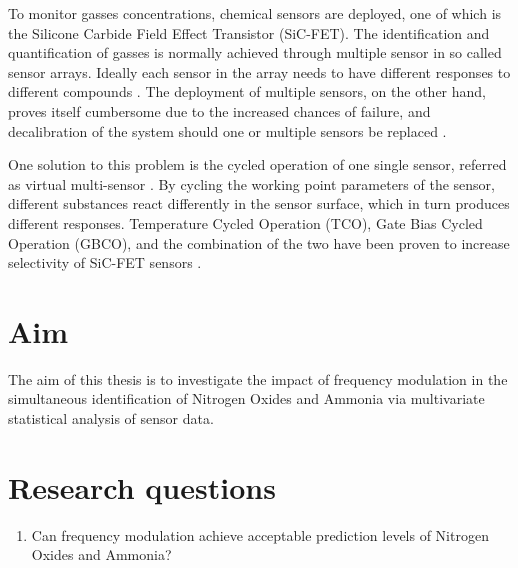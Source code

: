 To monitor gasses concentrations, chemical sensors are deployed, one of which is the Silicone Carbide Field Effect Transistor (SiC-FET). The identification and quantification of gasses is normally achieved through multiple sensor in so called sensor arrays. Ideally each sensor in the array needs to have different responses to different compounds \cite{Bastuck_2019}. The deployment of multiple sensors, on the other hand, proves itself cumbersome due to the increased chances of failure, and decalibration of the system should one or multiple sensors be replaced \cite{Bastuck_2019}.

One solution to this problem is the cycled operation of one single sensor, referred as virtual multi-sensor \cite{Bastuck_2019}. By cycling the working point parameters of the sensor, different substances react differently in the sensor surface, which in turn produces different responses. Temperature Cycled Operation (TCO), Gate Bias Cycled Operation (GBCO), and the combination of the two have been proven to increase selectivity of SiC-FET sensors \cite{Bastuck_2019}.

\section{Aim}
\label{sec:aim}


The aim of this thesis is to investigate the impact of frequency modulation in the simultaneous identification of Nitrogen Oxides and Ammonia via multivariate statistical analysis of sensor data.

\section{Research questions}
\label{sec:research-questions}

\begin{enumerate}
\item Can frequency modulation achieve acceptable prediction levels of Nitrogen Oxides and Ammonia?

\end{enumerate}




